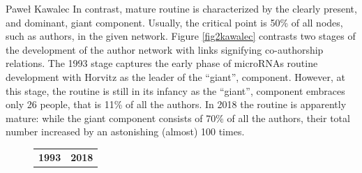 \begin{artengenv}{Paweł Kawalec}
In contrast, mature routine is characterized by the clearly present, and dominant, giant component. Usually, the critical point is 50\% of all nodes, such as authors, in the given network. Figure \ref{fig2kawalec} contrasts two stages of the development of the author network with links signifying co-authorship relations. The 1993 stage captures the early phase of microRNAs routine development with Horvitz as the leader of the ``giant'', component. However, at this stage, the routine is still in its infancy as the ``giant'', component embraces only 26 people, that is 11\% of all the authors. In 2018 the routine is apparently mature: while the giant component consists of 70\% of all the authors, their total number increased by an astonishing (almost) 100 times.

\begin{figure}[h!]
\begin{flushleft}
\tablefirsthead{}
\tablehead{}
\tabletail{}
\tablelasttail{}
\begin{tabular}{m{.5\linewidth}|m{.5\linewidth}}
{\centering\bfseries 1993\par}

 &
{\centering\bfseries 2018\par}


\end{tabular}
\end{flushleft}
\end{figure}
\end{artengenv}
